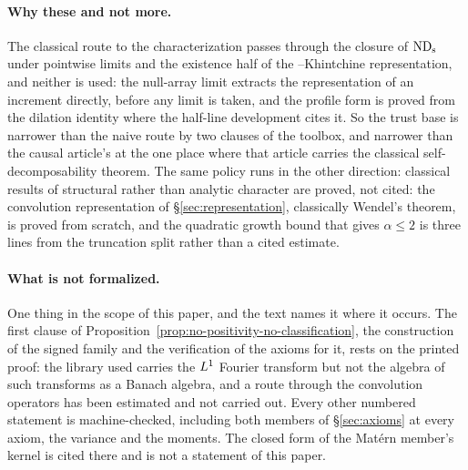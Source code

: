 \paragraph{Why these and not more.} The classical route to the characterization passes
through the closure of $\mathrm{ND}_{\mathrm{s}}$ under pointwise limits and the existence half of the
\Levy--Khintchine representation, and neither is used: the null-array limit extracts the
representation of an increment directly, before any limit is taken, and the profile form is
proved from the dilation identity where the half-line development cites it. So the trust
base is narrower than the naive route by two clauses of the toolbox, and narrower than the
causal article's at the one place where that article carries the classical
self-decomposability theorem. The same policy runs in the other direction: classical
results of structural rather than analytic character are proved, not cited: the
convolution representation of \S\ref{sec:representation}, classically Wendel's theorem, is
proved from scratch, and the quadratic growth bound that gives $\alpha \le 2$ is three lines
from the truncation split rather than a cited estimate.

\paragraph{What is not formalized.} One thing in the scope of this paper, and the text
names it where it occurs. The first clause of
Proposition~\ref{prop:no-positivity-no-classification}, the construction of the signed
family and the verification of the axioms for it, rests on the printed proof: the library
used carries the $L^1$ Fourier transform but not the algebra of such transforms as a
Banach algebra, and a route through the convolution operators has been estimated and not
carried out. Every other numbered statement is machine-checked, including both members of
\S\ref{sec:axioms} at every axiom, the variance and the moments. The closed form of the
Mat\'ern member's kernel is cited there and is not a statement of this paper.

